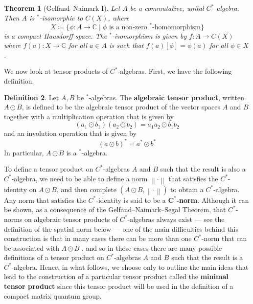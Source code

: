 \documentclass{article}
\theoremstyle{plain}
\newtheorem{theorem}{Theorem}[section]
\theoremstyle{definition}
\newtheorem{definition}[theorem]{Definition}
\theoremstyle{remark}
\newcommand{\norm}[1]{\left\lVert#1\right\rVert}
\begin{document}

\begin{theorem}[Gelfand--Naimark I]
	Let $A$ be a commutative, unital $C^*$-algebra.
	Then $A$ is $^*$-isomorphic to $C(X)$, where
	\begin{equation}
		X 
		\coloneqq
		\{\phi : A \rightarrow \mathbb{C} \mid 
			\phi \text{ is a non-zero } ^*\text{-homomorphism}\}
	\end{equation}
	is a compact Hausdorff space. 
	The $^*$-isomorphism is given by
	$f : A \rightarrow C(X)$ where $f(a) : X \rightarrow \mathbb{C}$ 
	for all $a \in A$ is such that $f(a)[\phi] = \phi(a)$ for all $\phi \in X$.
\end{theorem}

We now look at tensor products of $C^*$-algebras.
First, we have the following definition.
\begin{definition}
	Let $A, B$ be $^*$-algebras.
	The \textbf{algebraic tensor product}, written $A \odot B$,
	is defined to be the algebraic tensor product of the vector spaces
	$A$ and $B$ 
	together with a multiplication operation that is given by
	\begin{equation}
		(a_1 \odot b_1)(a_2 \odot b_2)
		=
		a_1a_2 \odot b_1b_2
	\end{equation}
	and an involution operation that is given by
	\begin{equation}
		(a \odot b)^*
		=
		a^* \odot b^*
	\end{equation}
	In particular, $A \odot B$ is a $^*$-algebra.
\end{definition}
To define a tensor product on $C^*$-algebras $A$ and $B$
such that the result is also a $C^*$-algebra, we need to be able to define
a norm $\norm{\cdot}$ that satisfies the $C^*$-identity on $A \odot B$,
and then complete $(A \odot B, \norm{\cdot})$ to obtain a $C^*$-algebra.
Any norm that satisfies the $C^*$-identity
is said to be a $\bm{C^*}$\textbf{-norm}.
Although it can be shown,
as a consequence of the Gelfand--Naimark--Segal Theorem,
that $C^*$-norms on algebraic tensor products
of $C^*$-algebras always exist 
--- see the definition of the spatial norm below ---
one of the main difficulties behind this construction 
is that in many cases there can be more than one
$C^*$-norm that can be associated with $A \odot B$
\citep{courtney2023notes},
and so in those cases
there are many possible definitions of a tensor product
on $C^*$-algebras $A$ and $B$ such that
the result is a $C^*$-algebra.
Hence, in what follows, we choose only to outline the main ideas 
that lead to the construction of a particular tensor product called the 
\textbf{minimal tensor product}
since this tensor product will be used in the definition 
of a compact matrix quantum group.
\end{document}
